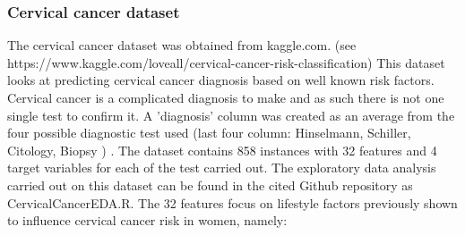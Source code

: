 \subsubsection{Cervical cancer dataset}
The cervical cancer dataset was obtained from kaggle.com. \newline
(see https://www.kaggle.com/loveall/cervical-cancer-risk-classification)\newline
This dataset looks at predicting cervical cancer diagnosis based on well known risk factors. Cervical cancer is a complicated diagnosis to make and as such there is not one single test to confirm it. A 'diagnosis' column was created as an average from the four possible diagnostic test used  (last four column: Hinselmann, Schiller, Citology, Biopsy ) \citep{Fernandes:2017td, Wu:2017fa}.\newline
The dataset contains 858 instances with 32 features and 4 target variables for each of the test carried out.
The exploratory data analysis carried out on this dataset can be found in the cited Github repository as CervicalCancerEDA.R.
The 32 features focus on lifestyle factors previously shown to influence cervical cancer risk in women, namely:
